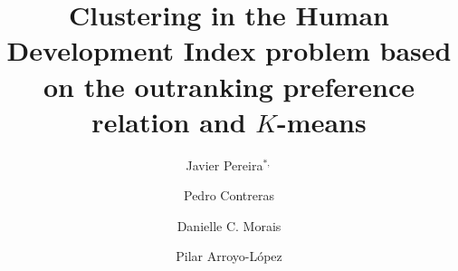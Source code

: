 \documentclass[]{elsarticle}
\theoremstyle{definition}
\begin{document}
\begin{frontmatter}                           %


\title{Clustering in the Human Development Index problem based on the outranking preference relation and $K$-means}



%

\author[utc]{Javier Pereira$^{*,}$\cortext[cor1]}
\author[ap]{Pedro Contreras}
\author[ufpe]{Danielle C. Morais}
\author[itesm]{Pilar Arroyo-L\'opez}




\address[utc]{Universidad Tecnol\'ogica de Chile Inacap, Santiago, Chile (xjavierpereira7@gmail.com); \\}
\address[ap]{WMC, The University of Warwick (pedro.contreras@acm.org);}
\address[ufpe]{Universidade Federal de Pernambuco, CDSID (dcmorais@cdsid.org.br);}
\address[itesm]{Tecnologico de Monterrey, Campus Toluca, M\'exico (pilar.arroyo@itesm.mx);}




\end{frontmatter}
\end{document}

